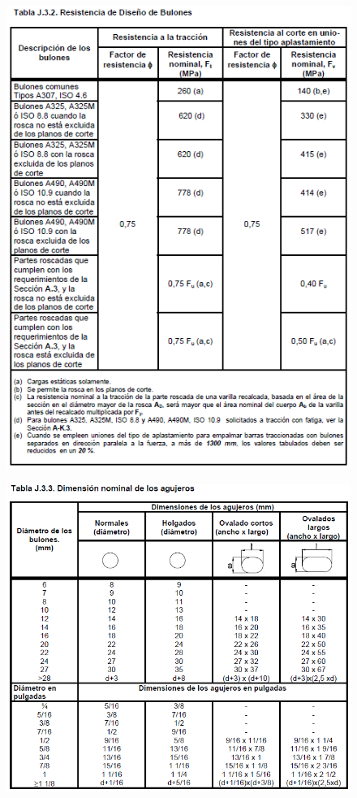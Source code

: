 \documentclass[twocolumn]{article}
\begin{document}
\begin{figure}[htb!]
	\centering
	\includegraphics[width=1.1\linewidth]{fig/tabJ32.PNG}
\end{figure}

\begin{figure}[htb!]
	\centering
	\includegraphics[width=\textwidth]{fig/tabJ33.PNG}
\end{figure}
\end{document}

